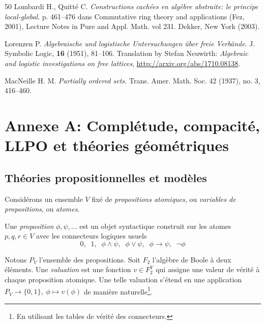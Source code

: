 \begin{thebibliography}{50}
  {\sc Lombardi H., Quitté C.}
{\em Constructions cach\'ees en algèbre abstraite: le principe
local-global}.  p. 461--476 dans Commutative ring theory and applications (Fez, 2001), Lecture Notes in Pure and Appl. Math. vol 231. Dekker, New York (2003).

{\sc Lorenzen  P.}
\emph{Algebraische und logistische {U}ntersuchungen {\"u}ber freie
              {V}erb{\"a}nde}.
{J. Symbolic Logic},
{\bf 16}
 (1951), {81--106}.
{Translation by Stefan Neuwirth: \emph{Algebraic and logistic investigations on free lattices}, \url{http://arxiv.org/abs/1710.08138}}.

 {\sc MacNeille H. M.} {\em Partially ordered sets.}
Trans. Amer. Math. Soc. 42 (1937), no. 3, 416--460.


\end{thebibliography}


\newpage
{}

\setcounter{section}{1}\setcounter{subsection}{0}
\setcounter{theorem}{0}  
\section*{Annexe A: Complétude, compacité, LLPO et théories géométriques}\label{Annexe}
\subsection{Théories propositionnelles et modèles}

Considérons un ensemble $V$ fixé de {\em propositions atomiques}, ou
{\em variables de propositions}, ou \emph{atomes}. 

Une \emph{proposition} $\phi,\psi,\dots$
est un objet syntactique construit sur les atomes  $p,q,r\in V$ avec les connecteurs logiques usuels
$$ 0,\;\;1,\;\;\phi\wedge \psi,\;\;\phi\vee\psi,\;\;\phi\rightarrow\psi,\;\;
\neg\phi
$$

Notons $P_V$ l'ensemble des propositions. Soit $F_2$
l'algèbre de Boole à deux éléments.
Une {\em valuation}
est une fonction $v\in F_2^V$ qui assigne une valeur de vérité à  
chaque proposition atomique. Une telle valuation s'étend en une application
$P_V\rightarrow \{0,1\},\;\phi\longmapsto v(\phi)$
de manière naturelle\footnote{En utilisant les tables de vérité des connecteurs.}. 

